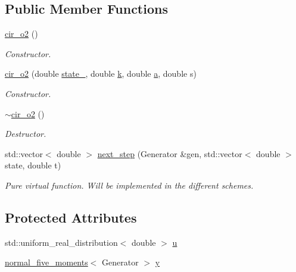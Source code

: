 \subsection*{Public Member Functions}
\begin{DoxyCompactItemize}
\item 
\hyperlink{classcir__o2_a0f645b7ab87c6318ecb8f4654cef6ed7}{cir\+\_\+o2} ()\hypertarget{classcir__o2_a0f645b7ab87c6318ecb8f4654cef6ed7}{}\label{classcir__o2_a0f645b7ab87c6318ecb8f4654cef6ed7}

\begin{DoxyCompactList}\small\item\em Constructor. \end{DoxyCompactList}\item 
\hyperlink{classcir__o2_ae29a2538f64d667ae2b5bbb4fa6a1964}{cir\+\_\+o2} (double \hyperlink{classprocess_ab4d01c8ea2e9c8285134786d32ae42aa}{state\+\_}, double \hyperlink{classcir_aa5b05ff03ee8bb587ea94426a9ce704b}{k}, double \hyperlink{classcir_a358578305ea60d31c00546233304651c}{a}, double s)\hypertarget{classcir__o2_ae29a2538f64d667ae2b5bbb4fa6a1964}{}\label{classcir__o2_ae29a2538f64d667ae2b5bbb4fa6a1964}

\begin{DoxyCompactList}\small\item\em Constructor. \end{DoxyCompactList}\item 
\hyperlink{classcir__o2_ac620cae85dd92526b320b885d33e1542}{$\sim$cir\+\_\+o2} ()\hypertarget{classcir__o2_ac620cae85dd92526b320b885d33e1542}{}\label{classcir__o2_ac620cae85dd92526b320b885d33e1542}

\begin{DoxyCompactList}\small\item\em Destructor. \end{DoxyCompactList}\item 
std\+::vector$<$ double $>$ \hyperlink{classcir__o2_aff77d63ff38cedf7f720f4bf081b3812}{next\+\_\+step} (Generator \&gen, std\+::vector$<$ double $>$ state, double t)\hypertarget{classcir__o2_aff77d63ff38cedf7f720f4bf081b3812}{}\label{classcir__o2_aff77d63ff38cedf7f720f4bf081b3812}

\begin{DoxyCompactList}\small\item\em Pure virtual function. Will be implemented in the different schemes. \end{DoxyCompactList}\end{DoxyCompactItemize}
\subsection*{Protected Attributes}
\begin{DoxyCompactItemize}
\item 
std\+::uniform\+\_\+real\+\_\+distribution$<$ double $>$ \hyperlink{classcir__o2_a37d01ddf0963358ef44dcb20938b54fa}{u}
\item 
\hyperlink{classnormal__five__moments}{normal\+\_\+five\+\_\+moments}$<$ Generator $>$ \hyperlink{classcir__o2_a13719fb45e809812b9f62916d6baba2c}{y}
\end{DoxyCompactItemize}



